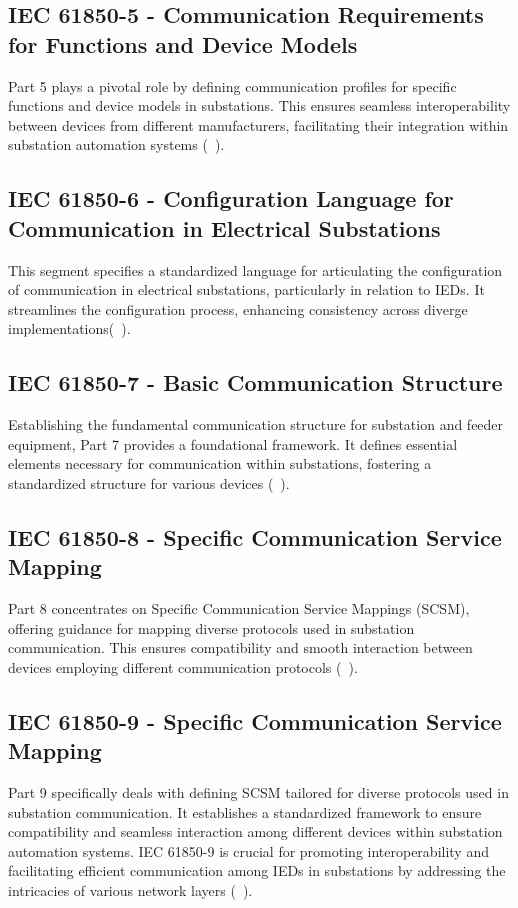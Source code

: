\subsection{IEC 61850-5 - Communication Requirements for Functions and Device Models}

Part 5 plays a pivotal role by defining communication profiles for specific functions and device models in substations. This ensures seamless interoperability between devices from different manufacturers, facilitating their integration within substation automation systems (~\cite{Overview_of_IEC_61850_and_Benefits}).

\subsection{IEC 61850-6 - Configuration Language for Communication in Electrical Substations}

This segment specifies a standardized language for articulating the configuration of communication in electrical substations, particularly in relation to IEDs. It streamlines the configuration process, enhancing consistency across diverge implementations(~\cite{Overview_of_IEC_61850_and_Benefits}).

\subsection{IEC 61850-7 - Basic Communication Structure}

Establishing the fundamental communication structure for substation and feeder equipment, Part 7 provides a foundational framework. It defines essential elements necessary for communication within substations, fostering a standardized structure for various devices (~\cite{Overview_of_IEC_61850_and_Benefits}).

\subsection{IEC 61850-8 - Specific Communication Service Mapping}

Part 8 concentrates on Specific Communication Service Mappings (SCSM), offering guidance for mapping diverse protocols used in substation communication. This ensures compatibility and smooth interaction between devices employing different communication protocols (~\cite{Overview_of_IEC_61850_and_Benefits}).

\subsection{IEC 61850-9 - Specific Communication Service Mapping}
Part 9 specifically deals with defining SCSM tailored for diverse protocols used in substation communication. It establishes a standardized framework to ensure compatibility and seamless interaction among different devices within substation automation systems. IEC 61850-9 is crucial for promoting interoperability and facilitating efficient communication among IEDs in substations by addressing the intricacies of various network layers (~\cite{Overview_of_IEC_61850_and_Benefits}).

